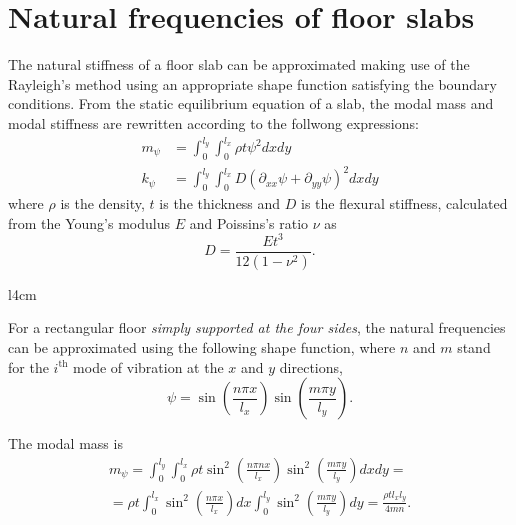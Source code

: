 \documentclass{article}
\begin{document}
\section*{Natural frequencies of floor slabs}

The natural stiffness of a floor slab can be approximated making use of the Rayleigh's method using an appropriate shape function satisfying the boundary conditions. From the static equilibrium equation of a slab, the modal mass and modal stiffness are rewritten according to the follwong expressions:
\begin{equation*}
\begin{aligned}
    m_\psi &= \int_0^{l_y}\int_0^{l_x} \rho t \psi^2 dxdy \\
    k_\psi &= \int_0^{l_y}\int_0^{l_x} D (\partial_{xx}\psi + \partial_{yy}\psi)^2 dxdy
\end{aligned}
\end{equation*}
where $\rho$ is the density, $t$ is the thickness and $D$ is the flexural stiffness, calculated from the Young's modulus $E$ and Poissins's ratio $\nu$ as
$$
D = \frac{Et^3}{12(1-\nu^2)}.
$$

\begin{wrapfigure}{l}{4cm}
\vspace{-1em}
\end{wrapfigure}

For a rectangular floor \emph{simply supported at the four sides}, the natural frequencies can be approximated using the following shape function, where $n$ and $m$ stand for the $i^\text{th}$ mode of vibration at the $x$ and $y$ directions,
$$
\psi = \sin\left(\frac{n\pi x}{l_x}\right) \sin\left(\frac{m\pi y}{l_y}\right).
$$

The modal mass is
\begin{multline*}
m_\psi = 
\int_0^{l_y}\int_0^{l_x} \rho t \sin^2\left(\frac{n\pi nx}{l_x}\right) \sin^2\left(\frac{m\pi y}{l_y}\right) dxdy = \\
= \rho t \int_0^{l_x} \sin^2\left(\frac{n\pi x}{l_x}\right) dx \int_0^{l_y} \sin^2\left(\frac{m\pi y}{l_y}\right) dy =
\frac{\rho t l_x l_y}{4mn}.
\end{multline*}
\end{document}
